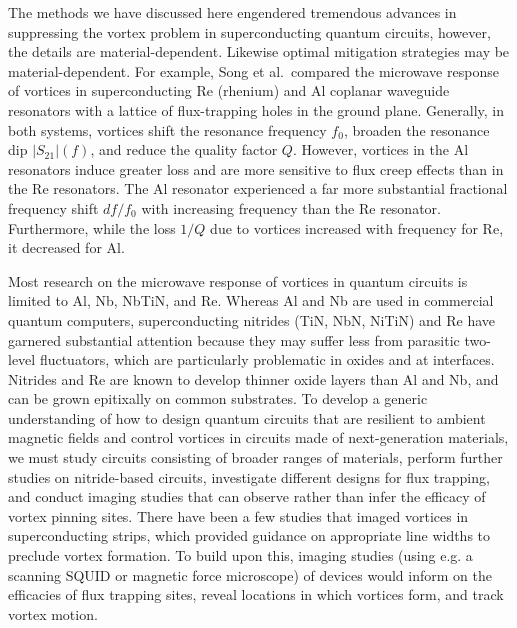 \documentclass[%
 aip,
 amsmath,amssymb,
 reprint,%
floatfix]{revtex4-1}
\begin{document}
The methods we have discussed here engendered tremendous advances in suppressing the vortex problem in superconducting quantum circuits, however, the details are material-dependent. Likewise optimal mitigation strategies may be material-dependent. For example, Song et al.\ compared the microwave response of vortices in superconducting Re (rhenium) and Al coplanar waveguide resonators with a lattice of flux-trapping holes in the ground plane.  Generally, in both systems, vortices shift the resonance frequency $f_0$, broaden the resonance dip $|S_{21}|(f)$, and reduce the quality factor $Q$. However, vortices in the Al resonators induce greater loss and are more sensitive to flux creep effects than in the Re resonators.  The Al resonator experienced a far more substantial fractional frequency shift $df/f_0$ with increasing frequency than the Re resonator. Furthermore, while the loss $1/Q$ due to vortices increased with frequency for Re, it decreased for Al.  

Most research on the microwave response of vortices in quantum circuits is limited to Al\cite{Song2009, Song2009a, Chiaro2016, PhysRevLett.113.117002, Wang2014}, Nb\cite{Bothner2012, Bothner2011, Stan2004, Kwon2018, Golosovsky1995}, NbTiN\cite{ Samkharadze2016, Kroll2019}, and Re\cite{Song2009a}.  Whereas Al and Nb are used in commercial quantum computers, superconducting nitrides (TiN, NbN, NiTiN)\cite{Sage2011, Ohya2013, Vissers2012a, Leduc2013, Sandberg2012, Chang2013, Kerman2006, Barends2010a, Barends2010b, Bruno2015} and Re have garnered substantial attention because they may suffer less from parasitic two-level fluctuators, which are particularly problematic in oxides and at interfaces\cite{Muller2019}.  Nitrides and Re are known to develop thinner oxide layers than Al and Nb, and can be grown epitixally on common substrates\cite{Dumur2016, WangMartinis2009, Vissers2010}.  To develop a generic understanding of how to design quantum circuits that are resilient to ambient magnetic fields and control vortices in circuits made of next-generation materials, we must study circuits consisting of broader ranges of materials, perform further studies on nitride-based circuits, investigate different designs for flux trapping, and conduct imaging studies that can observe rather than infer the efficacy of vortex pinning sites. There have been a few studies that imaged vortices in superconducting strips, which provided guidance on appropriate line widths to preclude vortex formation\cite{Stan2004, Kuit2008}.  To build upon this, imaging studies (using e.g. a scanning SQUID or magnetic force microscope) of devices would inform on the efficacies of flux trapping sites, reveal locations in which vortices form, and track vortex motion.
\end{document}
